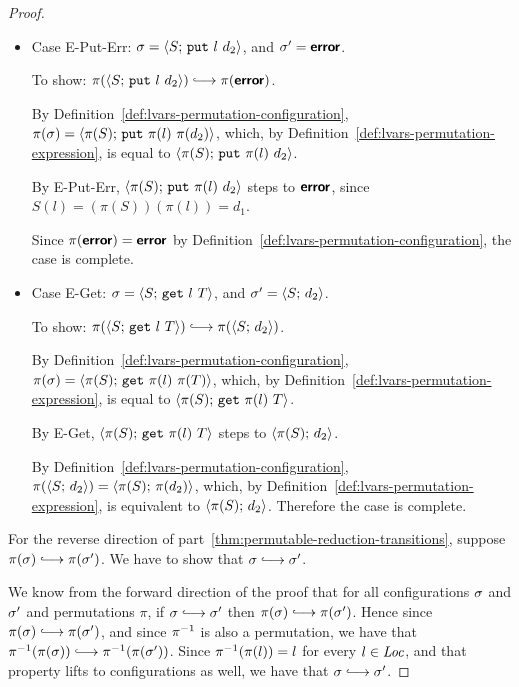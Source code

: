\begin{proof}
\begin{itemize}
    \item Case {\sc E-Put-Err}: $\sigma = \langle S;\, \mbox{\texttt{put}}~l~d_2 \rangle$,
      and $\sigma' = \textbf{\textsf{error}}$.

      To show: $\pi(\config{S}{\putexp{l}{d_2}}) \parstepsto
      \pi(\error)$.

      By Definition~\ref{def:lvars-permutation-configuration},
      $\pi(\sigma) = \langle \pi(S);\, \mbox{\texttt{put}}~\pi(l)~\pi(d_2) \rangle$,
      which, by Definition~\ref{def:lvars-permutation-expression}, is
      equal to $\langle \pi(S);\, \mbox{\texttt{put}}~\pi(l)~d_2 \rangle$.

      By {\sc E-Put-Err}, $\langle \pi(S);\, \mbox{\texttt{put}}~\pi(l)~d_2 \rangle$
      steps to $\textbf{\textsf{error}}$, since $S(l) = (\pi(S))(\pi(l)) = d_1$.

      Since $\pi(\textbf{\textsf{error}}) = \textbf{\textsf{error}}$ by
      Definition~\ref{def:lvars-permutation-configuration}, the case
      is complete.

    \item Case {\sc E-Get}: $\sigma = \langle S;\, \mbox{\texttt{get}}~l~T \rangle$, and
      $\sigma' = \langle S;\, d_2 \rangle$.

      To show: $\pi(\config{S}{\getexp{l}{T}}) \parstepsto
      \pi(\config{S}{d_2})$.

      By Definition~\ref{def:lvars-permutation-configuration},
      $\pi(\sigma) = \langle \pi(S);\, \mbox{\texttt{get}}~\pi(l)~\pi(T) \rangle$,
      which, by Definition~\ref{def:lvars-permutation-expression}, is
      equal to $\langle \pi(S);\, \mbox{\texttt{get}}~\pi(l)~T \rangle$.

      By {\sc E-Get}, $\langle \pi(S);\, \mbox{\texttt{get}}~\pi(l)~T \rangle$
      steps to $\langle \pi(S);\, d_2 \rangle$.

      By Definition~\ref{def:lvars-permutation-configuration},
      $\pi(\langle S;\, d_2 \rangle) = \langle \pi(S);\, \pi(d_2) \rangle$, which, by
      Definition~\ref{def:lvars-permutation-expression}, is equivalent
      to $\langle \pi(S);\, d_2 \rangle$.  Therefore the case is complete.
  \end{itemize}

  For the reverse direction of
  part~\ref{thm:permutable-reduction-transitions}, suppose $\pi(\conf)
  \parstepsto \pi(\conf')$.  We have to show that $\conf \parstepsto
  \conf'$.

  We know from the forward direction of the proof that for all
  configurations $\sigma$ and $\sigma'$ and permutations $\pi$, if
  $\conf \parstepsto \conf'$ then $\pi(\conf) \parstepsto
  \pi(\conf')$.  Hence since $\pi(\conf) \parstepsto \pi(\conf')$, and
  since $\pi^{-1}$ is also a permutation, we have that
  $\piinv(\pi(\conf)) \parstepsto \piinv(\pi(\conf'))$.  Since
  $\pi^{-1}(\pi(l)) = l$ for every $l \in \mathit{Loc}$, and that property lifts
  to configurations as well, we have that $\conf \parstepsto \conf'$.


\end{proof}
